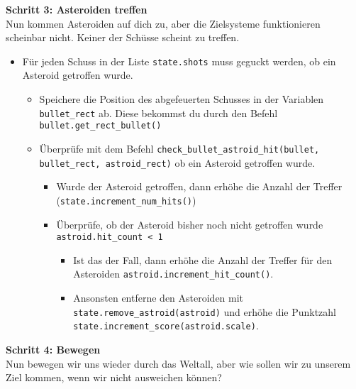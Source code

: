 \textbf{Schritt 3: Asteroiden treffen}\\
Nun kommen Asteroiden auf dich zu, aber die Zielsysteme funktionieren scheinbar nicht. Keiner der Schüsse scheint zu treffen.
\begin{itemize}
	\item Für jeden Schuss in der Liste \texttt{state.shots} muss geguckt werden, ob ein Asteroid getroffen wurde.
	\begin{itemize}
		\item Speichere die Position des abgefeuerten Schusses in der Variablen \texttt{bullet\_rect} ab. Diese bekommst du durch den Befehl \texttt{bullet.get\_rect\_bullet()}
		\item Überprüfe mit dem Befehl \texttt{check\_bullet\_astroid\_hit(bullet, bullet\_rect, astroid\_rect)} ob ein Asteroid getroffen wurde.
		\begin{itemize}
			\item Wurde der Asteroid getroffen, dann erhöhe die Anzahl der Treffer (\texttt{state.increment\_num\_hits()})
			\item Überprüfe, ob der Asteroid bisher noch nicht getroffen wurde \texttt{astroid.hit\_count < 1}
			\begin{itemize}
				\item Ist das der Fall, dann erhöhe die Anzahl der Treffer für den Asteroiden \texttt{astroid.increment\_hit\_count()}.
				\item Ansonsten entferne den Asteroiden mit \texttt{state.remove\_astroid(astroid)} und erhöhe die Punktzahl \texttt{state.increment\_score(astroid.scale)}.
			\end{itemize}
		\end{itemize}
	\end{itemize}
\end{itemize}
\textbf{Schritt 4: Bewegen}\\
Nun bewegen wir uns wieder durch das Weltall, aber wie sollen wir zu unserem Ziel kommen, wenn wir nicht ausweichen können?
